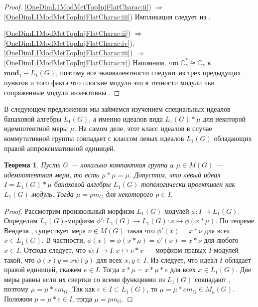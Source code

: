 \documentclass{article}
\numberwithin{equation}{section}
\theoremstyle{plain}
\newtheorem{theorem}{Теорема}
\theoremstyle{definition}
\newtheorem{proof}{Доказательство}\def\theproof{}
\newcommand{\convol}{\ast}
\newcommand{\isom}{\mathop{\mathbin{\cong}}}
\begin{document}
\begin{fulltext}
\begin{proof}
\ref{OneDimL1ModMetTopInjFlatCharac:ii}) $\Longrightarrow$ 
\ref{OneDimL1ModMetTopInjFlatCharac:iii}) Импликация следует из 
\cite[предложение~2.14]{NemGeomProjInjFlatBanMod}.

\ref{OneDimL1ModMetTopInjFlatCharac:ii}) $\Longrightarrow$
\ref{OneDimL1ModMetTopInjFlatCharac:iv}), \ref{OneDimL1ModMetTopInjFlatCharac:iii}) 
$\Longrightarrow$ \ref{OneDimL1ModMetTopInjFlatCharac:v}) Напомним, что 
$\mathbb{C}_\gamma^*\isom \mathbb{C}_\gamma$ в $\mathbf{mod}_1-L_1(G)$, поэтому 
все эквивалентности следуют из трех предыдущих пунктов и того факта что плоские 
модули это в точности модули чьи сопряженные модули инъективны 
\cite[предложение~2.21]{NemGeomProjInjFlatBanMod}.
\end{proof}

В следующем предложении мы займемся изучением специальных идеалов банаховой 
алгебры $L_1(G)$, а именно идеалов вида $L_1(G)\convol\mu$ для некоторой 
идемпотентной меры $\mu$. На самом деле, этот класс идеалов в случае 
коммутативной группы совпадает с классом левых идеалов $L_1(G)$ 
обладающих правой аппроксимативной единицей.

\begin{theorem}\label{CommIdealByIdemMeasL1MetTopProjCharac} Пусть $G$ --- 
локально компактная группа и $\mu\in M(G)$ --- идемпотентная мера, то есть 
$\mu\convol\mu=\mu$. Допустим, что левый идеал $I=L_1(G)\convol\mu$ 
банаховой алгебры $L_1(G)$ топологически проективен как $L_1(G)$-модуль. 
Тогда $\mu=p m_G$ для некоторого $p\in I$.
\end{theorem}
\begin{proof} Рассмотрим произвольный морфизм $L_1(G)$-модулей 
$\phi:I\to L_1(G)$. Определим $L_1(G)$-морфизм 
$\phi':L_1(G)\to L_1(G):x\mapsto\phi(x\convol\mu)$. 
По теореме Венделя \cite[теорема~1]{WendLeftCentrzrs}, существует 
мера $\nu\in M(G)$ такая что $\phi'(x)=x\convol\nu$ для всех 
$x\in L_1(G)$. В частности, $\phi(x)=\phi(x\convol\mu)=\phi'(x)=x\convol\nu$ 
для любого $x\in I$. Отсюда следует, что 
$\psi:I\to I:x\mapsto\nu\convol x$ --- морфизм правых $I$-модулей такой, что 
$\phi(x)y=x\psi(y)$ для всех $x,y\in I$. Из 
\cite[лемма~2, пункт~\textup{(ii)}]{NemMetTopProjIdBanAlg} следует, что 
идеал $I$ обладает правой единицей, скажем $e\in I$. Тогда 
$x\convol\mu=x\convol\mu\convol e$ для всех $x\in L_1(G)$. Две меры 
равны если их свертки со всеми функциями из $L_1(G)$ совпадают 
\cite[следствие~3.3.24]{DalBanAlgAutCont}, поэтому 
$\mu=\mu\convol e m_G$. Так как $e\in I\subset L_1(G)$, то 
$\mu=\mu\convol e m_G\in M_a(G)$. Положим $p=\mu\convol e\in I$, 
тогда $\mu=p m_G$.
\end{proof}


\end{fulltext}
\end{document}

